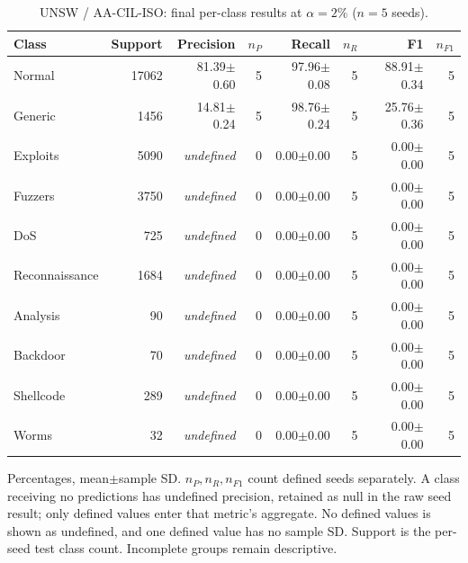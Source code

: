 \begin{table}[t]
\centering\scriptsize
\setlength{\tabcolsep}{3.3pt}
\caption{UNSW / AA-CIL-ISO: final per-class results at $\alpha=2\%$ ($n=5$ seeds).}\label{tab:forgetting-class-unsw_nb15-aacil-iso}
\begin{tabular}{lrrrrrrr}
\toprule
Class & Support & Precision & $n_P$ & Recall & $n_R$ & F1 & $n_{F1}$ \\
\midrule
Normal & 17062 & 81.39$\pm$0.60 & 5 & 97.96$\pm$0.08 & 5 & 88.91$\pm$0.34 & 5 \\
Generic & 1456 & 14.81$\pm$0.24 & 5 & 98.76$\pm$0.24 & 5 & 25.76$\pm$0.36 & 5 \\
Exploits & 5090 & \textit{undefined} & 0 & 0.00$\pm$0.00 & 5 & 0.00$\pm$0.00 & 5 \\
Fuzzers & 3750 & \textit{undefined} & 0 & 0.00$\pm$0.00 & 5 & 0.00$\pm$0.00 & 5 \\
DoS & 725 & \textit{undefined} & 0 & 0.00$\pm$0.00 & 5 & 0.00$\pm$0.00 & 5 \\
Reconnaissance & 1684 & \textit{undefined} & 0 & 0.00$\pm$0.00 & 5 & 0.00$\pm$0.00 & 5 \\
Analysis & 90 & \textit{undefined} & 0 & 0.00$\pm$0.00 & 5 & 0.00$\pm$0.00 & 5 \\
Backdoor & 70 & \textit{undefined} & 0 & 0.00$\pm$0.00 & 5 & 0.00$\pm$0.00 & 5 \\
Shellcode & 289 & \textit{undefined} & 0 & 0.00$\pm$0.00 & 5 & 0.00$\pm$0.00 & 5 \\
Worms & 32 & \textit{undefined} & 0 & 0.00$\pm$0.00 & 5 & 0.00$\pm$0.00 & 5 \\
\bottomrule
\end{tabular}
\par\smallskip\begin{minipage}{0.98\textwidth}\scriptsize Percentages, mean$\pm$sample SD. $n_P,n_R,n_{F1}$ count defined seeds separately. A class receiving no predictions has undefined precision, retained as null in the raw seed result; only defined values enter that metric's aggregate. No defined values is shown as undefined, and one defined value has no sample SD. Support is the per-seed test class count. Incomplete groups remain descriptive.\end{minipage}
\end{table}

